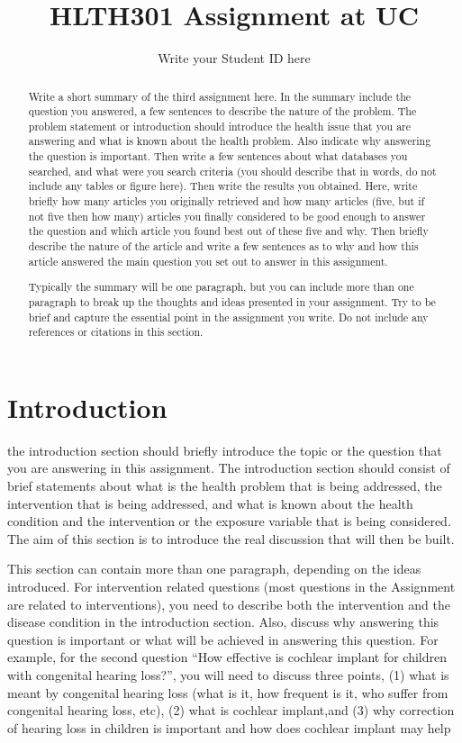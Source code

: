 \documentclass[a4paper]{article}
\title{HLTH301 Assignment at UC}
\author{Write your Student ID here}
\date{}
\begin{document}
\maketitle

\begin{abstract}
Write a short summary of the third assignment here. In the summary include the question you answered, a few sentences to describe the nature of the problem. The problem statement or introduction should introduce the health issue that you are answering and what is known about the health problem. Also indicate why answering the question is important. Then write a few sentences about what databases you searched, and what were you search criteria (you should describe that in words, do not include any tables or figure here). Then write the results you obtained. Here, write briefly how many articles you originally retrieved and how many articles (five, but if not five then how many) articles you finally considered to be good enough to answer the question and which article you found best out of these five and why. Then briefly describe the nature of the article and write a few sentences as to why and how this article answered the main question you set out to answer in this assignment.

Typically the summary will be one paragraph, but you can include more than one paragraph to break up the thoughts and ideas presented in your assignment. Try to be brief and capture the essential point in the assignment you write. Do not include any references or citations in this section. 

\end{abstract}

\section*{Introduction}

the introduction section should briefly introduce the topic or the question that you are answering in this assignment. The introduction section should consist of brief statements about what is the health problem that is being addressed, the intervention that is being addressed, and what is known about the health condition and the intervention or the exposure variable that is being considered. The aim of this section is to introduce the real discussion that will then be built.

This section can contain more than one paragraph, depending on the ideas introduced. For intervention related questions (most questions in the Assignment are related to interventions), you need to describe both the intervention and the disease condition in the introduction section. Also, discuss why answering this question is important or what will be achieved in answering this question. For example, for the second question “How effective is cochlear implant for children with congenital hearing loss?”, you will need to discuss three points, (1) what is meant by congenital hearing loss (what is it, how frequent is it, who suffer from congenital hearing loss, etc), (2) what is cochlear implant,and (3) why correction of hearing loss in children is important and how does cochlear implant may help 
\end{document}
